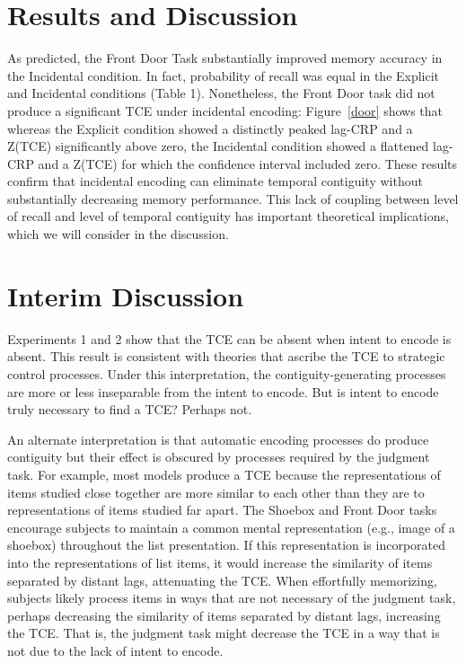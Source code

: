 \documentclass[jou,natbib,floatsintext]{apa6} %
\begin{document}
\section{Results and Discussion}
As predicted, the Front Door Task substantially improved memory accuracy in the Incidental condition. In fact, probability of recall was equal in the Explicit and Incidental conditions (Table 1). Nonetheless, the Front Door task did not produce a significant TCE under incidental encoding: Figure~\ref{door} shows that whereas the Explicit condition showed a distinctly peaked lag-CRP and a Z(TCE) significantly above zero, the Incidental condition showed a flattened lag-CRP and a Z(TCE) for which the confidence interval included zero. These results confirm that incidental encoding can eliminate temporal contiguity without substantially decreasing memory performance. This lack of coupling between level of recall and level of temporal contiguity has important theoretical implications, which we will consider in the discussion.


\begin{figure*}%
\caption{The temporal contiguity effect (TCE) with the Front Door size judgment task under explicit versus incidental encoding. \paneltext}
\label{door}
\end{figure*}








\section{Interim Discussion}
Experiments 1 and 2 show that the TCE can be absent when intent to encode is absent. This result is consistent with theories that ascribe the TCE to strategic control processes. Under this interpretation, the contiguity-generating processes are more or less inseparable from the intent to encode. But is intent to encode truly necessary to find a TCE? Perhaps not.

An alternate interpretation is that automatic encoding processes do produce contiguity but their effect is obscured by processes required by the judgment task. For example, most models produce a TCE because the representations of items studied close together are more similar to each other than they are to representations of items studied far apart. The Shoebox and Front Door tasks encourage subjects to maintain a common mental representation (e.g., image of a shoebox) throughout the list presentation. If this representation is incorporated into the representations of list items, it would increase the similarity of items separated by distant lags, attenuating the TCE. When effortfully memorizing, subjects likely process items in ways that are not necessary of the judgment task, perhaps decreasing the similarity of items separated by distant lags, increasing the TCE. That is, the judgment task might decrease the TCE in a way that is not due to the lack of intent to encode.
\end{document}
